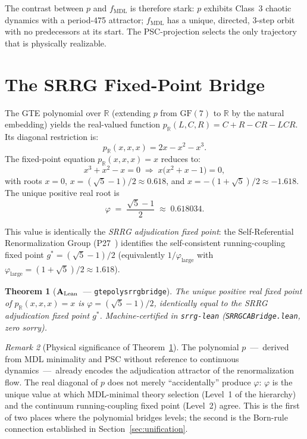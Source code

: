 \documentclass[11pt]{article}
\newtheorem{theorem}{Theorem}[section]
\theoremstyle{remark}
\newtheorem{remark}[theorem]{Remark}
\newcommand{\GF}[1]{\ensuremath{\mathrm{GF}(#1)}}
\newcommand{\lean}[1]{%
  \penalty-100
  \begingroup\def\_{\textunderscore\allowbreak}\texttt{#1}\endgroup}
\newcommand{\fmdl}{\ensuremath{f_{\mathrm{MDL}}}}
\newcommand{\CatAL}{\ensuremath{\textbf{A}_{\rm Lean}}}
\begin{document}
The contrast between $p$ and \fmdl{} is therefore stark: $p$ exhibits
Class~3 chaotic dynamics with a period-475 attractor; \fmdl{} has a
unique, directed, 3-step orbit with no predecessors at its start. The
PSC-projection selects the only trajectory that is physically realizable.


\section{The SRRG Fixed-Point Bridge}
\label{sec:srrg_bridge}

The GTE polynomial over $\mathbb{R}$ (extending $p$ from $\GF{7}$ to $\mathbb{R}$
by the natural embedding) yields the real-valued function
$p_{\mathbb{R}}(L,C,R) = C+R-CR-LCR$. Its diagonal restriction is:
\begin{equation}
  p_{\mathbb{R}}(x,x,x) = 2x - x^2 - x^3.
\end{equation}
The fixed-point equation $p_{\mathbb{R}}(x,x,x) = x$ reduces to:
\begin{equation}
  x^3 + x^2 - x = 0
  \;\Longrightarrow\;
  x\bigl(x^2 + x - 1\bigr) = 0,
\end{equation}
with roots $x = 0$, $x = (\sqrt{5}-1)/2 \approx 0.618$, and
$x = -(1+\sqrt{5})/2 \approx -1.618$. The unique positive real root is
\begin{equation}
  \varphi \;=\; \frac{\sqrt{5}-1}{2} \;\approx\; 0.618034.
\end{equation}

This value is identically the \emph{SRRG adjudication fixed point}:
the Self-Referential Renormalization Group (P27~\cite{SpivackSRRG}) identifies
the self-consistent running-coupling fixed point $g^* = (\sqrt{5}-1)/2$
(equivalently $1/\varphi_{\mathrm{large}}$ with
$\varphi_{\mathrm{large}} = (1+\sqrt{5})/2 \approx 1.618$).

\begin{theorem}[\CatAL\ — \lean{gte\_poly\_srrg\_bridge}]
\label{thm:srrg_bridge}
The unique positive real fixed point of $p_{\mathbb{R}}(x,x,x) = x$ is
$\varphi = (\sqrt{5}-1)/2$, identically equal to the SRRG adjudication
fixed point $g^*$. Machine-certified in \texttt{srrg-lean}
(\texttt{SRRGCABridge.lean}, zero sorry).
\end{theorem}

\begin{remark}[Physical significance of Theorem~\ref{thm:srrg_bridge}]
The polynomial $p$~---~derived from MDL minimality and PSC without reference
to continuous dynamics~---~already encodes the adjudication attractor of the
renormalization flow. The real diagonal of $p$ does not merely ``accidentally''
produce $\varphi$: $\varphi$ is the unique value at which MDL-minimal theory
selection (Level~1 of the hierarchy) and the continuum running-coupling fixed
point (Level~2) agree. This is the first of two places where the polynomial
bridges levels; the second is the Born-rule connection established in
Section~\ref{sec:unification}.
\end{remark}
\end{document}
